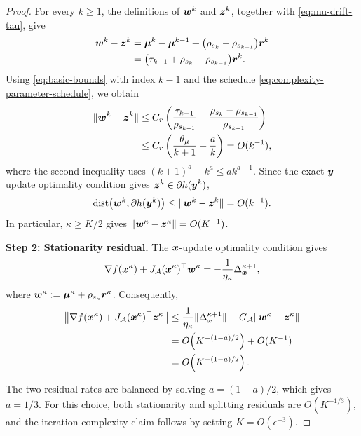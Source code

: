\begin{proof}
For every $k\ge1$, the definitions of $\bm{w}^k$ and $\bm{z}^k$, together with
\eqref{eq:mu-drift-tau}, give
\[
\begin{aligned}
    \bm{w}^k-\bm{z}^k
    &=
    \bm{\mu}^k-\bm{\mu}^{k-1}
    +\bigl(\rho_{s_k}-\rho_{s_{k-1}}\bigr)\bm{r}^k\\
    &=
    \bigl(
        \tau_{k-1}+\rho_{s_k}-\rho_{s_{k-1}}
    \bigr)\bm{r}^k.
\end{aligned}
\]
Using \eqref{eq:basic-bounds} with index $k-1$ and the schedule
\eqref{eq:complexity-parameter-schedule}, we obtain
\[
\begin{aligned}
    \|\bm{w}^k-\bm{z}^k\|
    &\le
    C_r\left(
        \frac{\tau_{k-1}}{\rho_{s_{k-1}}}
        +
        \frac{\rho_{s_k}-\rho_{s_{k-1}}}
             {\rho_{s_{k-1}}}
    \right)\\
    &\le
    C_r\left(
        \frac{\theta_\mu}{k+1}
        +\frac{a}{k}
    \right)
    =O(k^{-1}),
\end{aligned}
\]
where the second inequality uses
$(k+1)^a-k^a\le ak^{a-1}$.  Since the exact $\bm{y}$-update optimality
condition gives $\bm{z}^k\in\partial h(\bm{y}^k)$,
\[
    \operatorname{dist}\bigl(\bm{w}^k,\partial h(\bm{y}^k)\bigr)
    \le \|\bm{w}^k-\bm{z}^k\|
    =O(k^{-1}).
\]
In particular, $\kappa\ge K/2$ gives
$\|\bm{w}^\kappa-\bm{z}^\kappa\|=O(K^{-1})$.

\textbf{Step 2: Stationarity residual.}
The $\bm{x}$-update optimality condition gives
\[
    \nabla f(\bm{x}^\kappa)
    +
    J_{\mathcal{A}}(\bm{x}^\kappa)^\top \bm{w}^\kappa
    =
    -\frac{1}{\eta_\kappa}\Delta_{\bm{x}}^{\kappa+1},
\]
where $\bm{w}^\kappa:=\bm{\mu}^\kappa+\rho_{s_\kappa}\bm{r}^\kappa$.
Consequently,
\[
\begin{aligned}
    \left\|
        \nabla f(\bm{x}^\kappa)
        +J_{\mathcal{A}}(\bm{x}^\kappa)^\top \bm{z}^\kappa
    \right\|
    &\le
    \frac{1}{\eta_\kappa}\|\Delta_{\bm{x}}^{\kappa+1}\|
    +G_{\mathcal{A}}\|\bm{w}^\kappa-\bm{z}^\kappa\|\\
    &=O\!\left(K^{-(1-a)/2}\right)+O(K^{-1})\\
    &=O\!\left(K^{-(1-a)/2}\right).
\end{aligned}
\]

The two residual rates are balanced by solving
$a=(1-a)/2$, which gives $a=1/3$. For this choice, both stationarity and
splitting residuals are $O(K^{-1/3})$, and the iteration complexity claim follows by
setting $K=O(\epsilon^{-3})$.
\end{proof}

